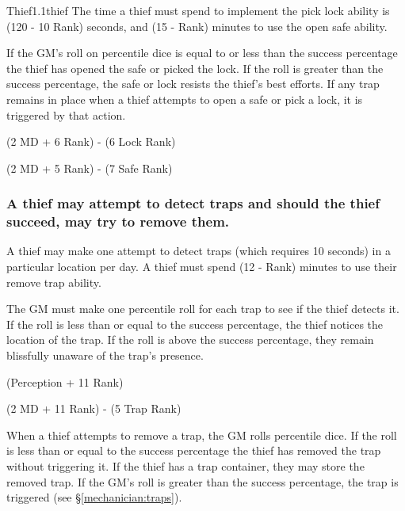 \begin{skill}{Thief}{1.1}{thief}
The time a thief must spend to implement the pick lock ability is (120
- 10 \x Rank) seconds, and (15 - Rank) minutes to use the open safe
ability.

If the GM's roll on percentile dice is equal to or less than the
success percentage the thief has opened the safe or picked the
lock. If the roll is greater than the success percentage, the safe or
lock resists the thief's best efforts.  If any trap remains in place
when a thief attempts to open a safe or pick a lock, it is triggered
by that action.

\begin{Description}

\item[For Thief to Pick Lock] (2 \x  MD + 6 \x  Rank) - (6  \x  Lock  Rank)

\item[For Thief to Open Safe] (2 \x MD + 5 \x Rank) - (7 \x Safe Rank)

\end{Description}

\subsubsection{A thief may attempt to detect traps and should the thief
succeed, may try to remove them.}
\label{thief:removetraps}

A thief may make one attempt to detect traps (which requires 10
seconds) in a particular location per day.  A thief must spend (12 -
Rank) minutes to use their remove trap ability.

The GM must make one percentile roll for each trap to see if the thief
detects it. If the roll is less than or equal to the success
percentage, the thief notices the location of the trap. If the roll is
above the success percentage, they remain blissfully unaware of the
trap's presence.

\begin{Description}

\item[For Thief to Detect Trap] (Perception + 11 \x Rank)

\item[For Thief to Remove Trap] (2 \x MD + 11 \x Rank) - (5 \x Trap Rank)

\end{Description}

When a thief attempts to remove a trap, the GM rolls percentile dice.
If the roll is less than or equal to the success percentage the thief
has removed the trap without triggering it. If the thief has a trap
container, they may store the removed trap. If the GM's roll is
greater than the success percentage, the trap is triggered (see
\S\ref{mechanician:traps}).


\end{skill}
